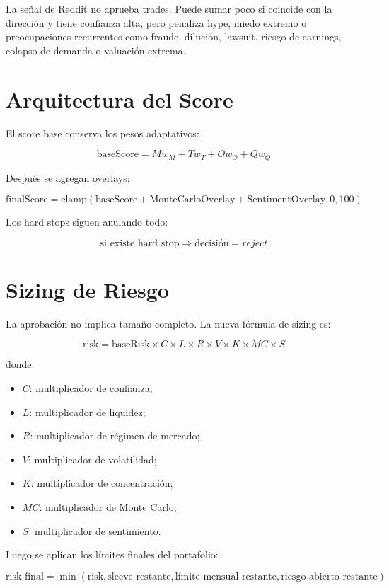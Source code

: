 \documentclass[11pt,letterpaper]{article}
\begin{document}
La señal de Reddit no aprueba trades. Puede sumar poco si coincide con la dirección y tiene confianza alta, pero penaliza hype, miedo extremo o preocupaciones recurrentes como fraude, dilución, lawsuit, riesgo de earnings, colapso de demanda o valuación extrema.

\section{Arquitectura del Score}

El score base conserva los pesos adaptativos:

\[
\text{baseScore} =
M w_M + T w_T + O w_O + Q w_Q
\]

Después se agregan overlays:

\[
\text{finalScore} =
\text{clamp}(\text{baseScore} + \text{MonteCarloOverlay} + \text{SentimentOverlay}, 0, 100)
\]

Los hard stops siguen anulando todo:

\[
\text{si existe hard stop} \Rightarrow \text{decisión} = reject
\]

\section{Sizing de Riesgo}

La aprobación no implica tamaño completo. La nueva fórmula de sizing es:

\[
\text{risk} =
\text{baseRisk}
\times C
\times L
\times R
\times V
\times K
\times MC
\times S
\]

donde:

\begin{itemize}
  \item \(C\): multiplicador de confianza;
  \item \(L\): multiplicador de liquidez;
  \item \(R\): multiplicador de régimen de mercado;
  \item \(V\): multiplicador de volatilidad;
  \item \(K\): multiplicador de concentración;
  \item \(MC\): multiplicador de Monte Carlo;
  \item \(S\): multiplicador de sentimiento.
\end{itemize}

Luego se aplican los límites finales del portafolio:

\[
\text{risk final} = \min(
\text{risk},
\text{sleeve restante},
\text{límite mensual restante},
\text{riesgo abierto restante})
\]
\end{document}
